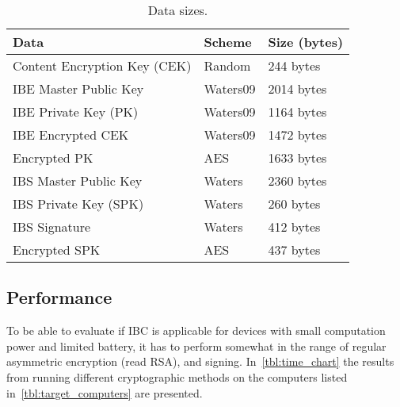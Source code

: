 \begin{table}[h]
  \begin{tabular}{lll}
  Data                            & Scheme          & Size (bytes)      \\ \hline
  Content Encryption Key (CEK)    & Random          & 244 bytes         \\ %
  IBE Master Public Key           & Waters09        & 2014 bytes        \\ %
  IBE Private Key (PK)            & Waters09        & 1164 bytes        \\ %
  IBE Encrypted CEK               & Waters09        & 1472 bytes        \\ %
  Encrypted PK                    & AES             & 1633 bytes        \\ %
  IBS Master Public Key           & Waters          & 2360 bytes        \\ %
  IBS Private Key (SPK)           & Waters          & 260 bytes         \\ %
  IBS Signature                   & Waters          & 412 bytes         \\ %
  Encrypted SPK                   & AES             & 437 bytes         \\ %
  \end{tabular}
  \caption{Data sizes.}
  \label{tbl:size_chart}
\end{table}


\subsection{Performance}
To be able to evaluate if \gls{IBC} is applicable for devices with small computation power and limited battery, it has to perform somewhat in the range of regular asymmetric encryption (read RSA), and signing. 
In~\autoref{tbl:time_chart} the results from running different cryptographic methods on the computers listed in~\autoref{tbl:target_computers} are presented.

